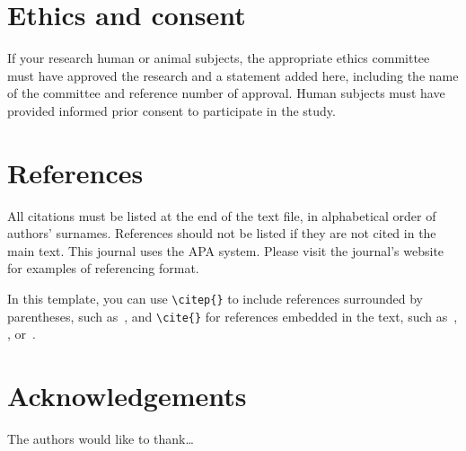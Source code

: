 \documentclass{article}
\begin{document}
\section{Ethics and consent}

If your research human or animal subjects, the appropriate ethics
committee must have approved the research and a statement added here,
including the name of the committee and reference number of approval.
Human subjects must have provided informed prior consent
to participate in the study.

\section{References}

All citations must be listed at the end of the text file,
in alphabetical order of authors' surnames.
References should not be listed if they are not cited in
the main text.
This journal uses the APA system.
Please visit the journal's website
for examples of referencing format.

In this template, you can use \verb=\citep{}= to include references
surrounded by parentheses, such as~\citep{KneesS16_MusicSimilarityRetrieval_SPRINGER}, and \verb=\cite{}=
for references embedded in the text,
such as~\cite{WeihsJVR16_MusicDataAnalysis_CRC},
\cite{SerraEtAl13_RoadmapMIR_CreativeCommon},
or~\cite{Mueller15_FMP_SPRINGER}.


\theendnotes{}

\section*{Acknowledgements}

The authors would like to thank\dots




%
%
%
%
\end{document}
